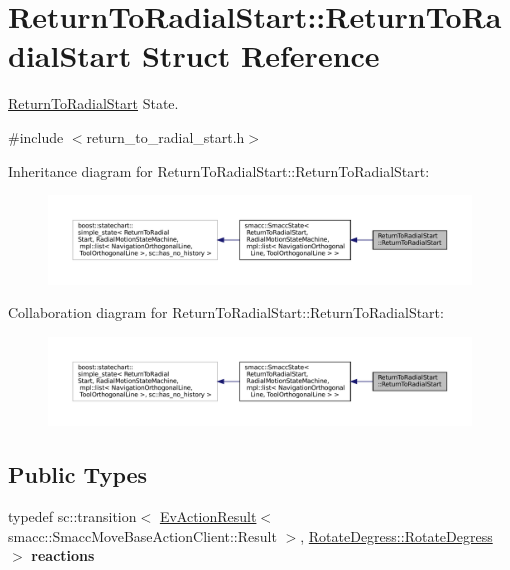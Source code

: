 \hypertarget{structReturnToRadialStart_1_1ReturnToRadialStart}{}\section{Return\+To\+Radial\+Start\+:\+:Return\+To\+Radial\+Start Struct Reference}
\label{structReturnToRadialStart_1_1ReturnToRadialStart}


\hyperlink{structReturnToRadialStart_1_1ReturnToRadialStart}{Return\+To\+Radial\+Start} State.  




{\ttfamily \#include $<$return\+\_\+to\+\_\+radial\+\_\+start.\+h$>$}



Inheritance diagram for Return\+To\+Radial\+Start\+:\+:Return\+To\+Radial\+Start\+:
\nopagebreak
\begin{figure}[H]
\begin{center}
\leavevmode
\includegraphics[width=350pt]{structReturnToRadialStart_1_1ReturnToRadialStart__inherit__graph}
\end{center}
\end{figure}


Collaboration diagram for Return\+To\+Radial\+Start\+:\+:Return\+To\+Radial\+Start\+:
\nopagebreak
\begin{figure}[H]
\begin{center}
\leavevmode
\includegraphics[width=350pt]{structReturnToRadialStart_1_1ReturnToRadialStart__coll__graph}
\end{center}
\end{figure}
\subsection*{Public Types}
\begin{DoxyCompactItemize}
\item 
\mbox{\label{structReturnToRadialStart_1_1ReturnToRadialStart_a74a509e54d1b8eefbaa1ff19ba6f5b57}} 
typedef sc\+::transition$<$ \hyperlink{structsmacc_1_1EvActionResult}{Ev\+Action\+Result}$<$ smacc\+::\+Smacc\+Move\+Base\+Action\+Client\+::\+Result $>$, \hyperlink{structRotateDegress_1_1RotateDegress}{Rotate\+Degress\+::\+Rotate\+Degress} $>$ {\bfseries reactions}
\end{DoxyCompactItemize}
